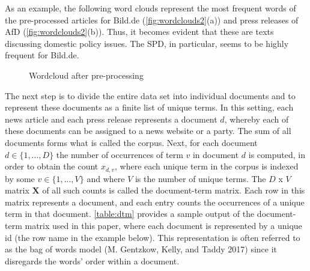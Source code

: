 \documentclass[
  12pt,
]{article}
\begin{document}
As an example, the following word clouds represent the most frequent
words of the pre-processed articles for Bild.de
(\autoref{fig:wordclouds2}(a)) and press releases of AfD
(\autoref{fig:wordclouds2}(b)). Thus, it becomes evident that these are
texts discussing domestic policy issues. The SPD, in particular, seems
to be highly frequent for Bild.de.

\begin{figure}

{\centering {}

}

\caption{Wordcloud after pre-processing \label{fig:wordclouds2}}\label{fig:wordclouds2}
\end{figure}

The next step is to divide the entire data set into individual documents
and to represent these documents as a finite list of unique terms. In
this setting, each news article and each press release represents a
document \(d\), whereby each of these documents can be assigned to a
news website or a party. The sum of all documents forms what is called
the corpus. Next, for each document \(d \in \lbrace 1,...,D \rbrace\)
the number of occurrences of term \(v\) in document \(d\) is computed,
in order to obtain the count \(x_{d,v}\), where each unique term in the
corpus is indexed by some \(v \in \lbrace 1,...,V \rbrace\) and where
\(V\) is the number of unique terms. The \(D\) x \(V\) matrix
\(\boldsymbol{X}\) of all such counts is called the document-term
matrix. Each row in this matrix represents a document, and each entry
counts the occurrences of a unique term in that document.
\autoref{table:dtm} provides a sample output of the document-term matrix
used in this paper, where each document is represented by a unique id
(the row name in the example below). This representation is often
referred to as the bag of words model (M. Gentzkow, Kelly, and Taddy
2017) since it disregards the words' order within a document.
\end{document}
